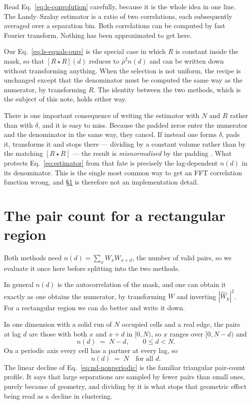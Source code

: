 \documentclass[12pt]{article}
\newcommand{\W}{W}
\newcommand{\corr}{\star}
\begin{document}
Read Eq.~\eqref{eq:ls-convolution} carefully, because it is the whole idea in
one line.  The Landy--Szalay estimator is a ratio of two correlations, each
subsequently averaged over a separation bin.  Both correlations can be
computed by fast Fourier transform.  Nothing has been approximated to get
here.

Our Eq.~\eqref{eq:ls-equals-ours} is the special case in which $R$ is
constant inside the mask, so that $[R\corr R](d)$ reduces to
$\bar\rho^2 n(d)$ and can be written down without transforming anything.
When the selection is not uniform, the recipe is unchanged except that the
denominator must be computed the same way as the numerator, by transforming
$R$.  The identity between the two methods, which is the subject of this note,
holds either way.

There is one important consequence of writing the estimator with $N$ and $R$
rather than with $\delta$, and it is easy to miss.  Because the padded zeros
enter the numerator and the denominator in the same way, they cancel.  If
instead one forms $\delta$, pads it, transforms it and stops there ---
dividing by a constant volume rather than by the matching $[R\corr R]$ ---
the result is \emph{misnormalised} by the padding
\citep{Slepian2016}.  What protects Eq.~\eqref{eq:estimator} from that fate is
precisely the lag-dependent $n(d)$ in its denominator.  This is the single
most common way to get an FFT correlation function wrong, and
\S\ref{sec:denominator} is therefore not an implementation detail.

\section{The pair count for a rectangular region}\label{sec:denominator}

Both methods need $n(d) = \sum_x \W_x \W_{x+d}$, the number of valid pairs,
so we evaluate it once here before splitting into the two methods.

In general $n(d)$ is the autocorrelation of the mask, and one can obtain it
exactly as one obtains the numerator, by transforming $\W$ and inverting
$|\hat\W_k|^2$.  For a rectangular region we can do better and write it
down.

In one dimension with a solid run of $N$ occupied cells and a real edge, the
pairs at lag $d$ are those with both $x$ and $x+d$ in $[0,N)$, so
$x$ ranges over $[0, N-d)$ and
\begin{equation}\label{eq:nd-nonperiodic}
  n(d) \;=\; N - d, \qquad 0 \le d < N .
\end{equation}
On a periodic axis every cell has a partner at every lag, so
\begin{equation}\label{eq:nd-periodic}
  n(d) \;=\; N \quad \text{for all } d .
\end{equation}
The linear decline of Eq.~\eqref{eq:nd-nonperiodic} is the familiar
triangular pair-count profile.  It says that large separations are sampled by
fewer pairs than small ones, purely because of geometry, and dividing by it
is what stops that geometric effect being read as a decline in clustering.
\end{document}
